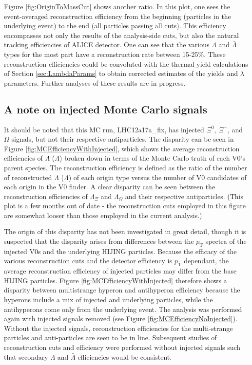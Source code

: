 Figure \ref{fig:OriginToMassCut} shows another ratio.  In this plot, one sees the event-averaged reconstruction efficiency from the beginning (particles in the underlying event) to the end (all particles passing all cuts).  This efficiency encompasses not only the results of the analysis-side cuts, but also the natural tracking efficiencies of ALICE detector.  One can see that the various $\Lambda$ and $\bar{\Lambda}$ types for the most part have a reconstruction rate between 15-25\%.  These reconstruction efficiencies could be convoluted with the thermal yield calculations of Section \ref{sec:LambdaParams} to obtain corrected estimates of the yields and $\lambda$ parameters.  Further analyses of these results are in progress.

\subsection{A note on injected Monte Carlo signals}
\label{sec:InjectedMCSignals}

It should be noted that this MC run, LHC12a17a\_fix, has injected $\Xi^0$, $\Xi^-$, and $\Omega$ signals, but not their respective antiparticles.  The disparity can be seen in Figure \ref{fig:MCEfficiencyWithInjected}, which shows the average reconstruction efficiencies of $\Lambda$ ($\bar{\Lambda}$) broken down in terms of the Monte Carlo truth of each V0's parent species. The reconstruction efficiency is defined as the ratio of the number of reconstructed $\Lambda$ ($\bar{\Lambda}$) of each origin type versus the number of V0 candidates of each origin in the V0 finder.  A clear disparity can be seen between the reconstruction efficiencies of $\Lambda_{\Xi}$ and $\Lambda_{\Omega}$ and their respective antiparticles.  (This plot is a few months out of date - the reconstruction cuts employed in this figure are somewhat looser than those employed in the current analysis.)

The origin of this disparity has not been investigated in great detail, though it is suspected that the disparity arises from differences between the $p_\mathrm{T}$ spectra of the injected V0s and the 
underlying HIJING particles.  Because the efficacy of the various reconstruction cuts and the detector efficiency is $p_\mathrm{T}$ dependant, the average reconstruction efficiency of injected particles may differ from the base HIJING particles.  Figure \ref{fig:MCEfficiencyWithInjected} therefore shows a disparity between multistrange hyperon and antihyperon efficiency because the hyperons include a mix of injected and underlying particles, while the antihyperons come only from the underlying event. The analysis was performed again with injected signals removed (see Figure \ref{fig:MCEfficiencyNoInjected}).  Without the injected signals, reconstruction efficiencies for the multi-strange particles and anti-particles are seen to be in line.  Subsequent studies of reconstruction cuts and efficiency were performed without injected signals such that secondary $\Lambda$ and $\bar{\Lambda}$ efficiencies would be consistent.


